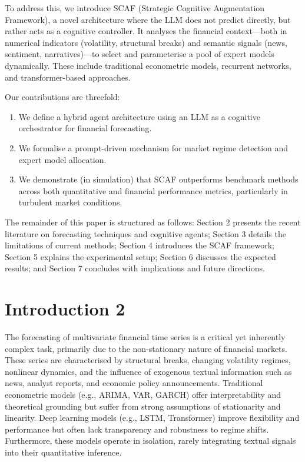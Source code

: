 \documentclass[conference]{IEEEtran}
\begin{document}
To address this, we introduce SCAF (Strategic Cognitive Augmentation Framework), a novel architecture where the LLM does not predict directly, but rather acts as a cognitive controller. It analyses the financial context—both in numerical indicators (volatility, structural breaks) and semantic signals (news, sentiment, narratives)—to select and parameterise a pool of expert models dynamically. These include traditional econometric models, recurrent networks, and transformer-based approaches.

Our contributions are threefold:
\begin{enumerate}
    \item We define a hybrid agent architecture using an LLM as a cognitive orchestrator for financial forecasting.
    \item We formalise a prompt-driven mechanism for market regime detection and expert model allocation.
    \item We demonstrate (in simulation) that SCAF outperforms benchmark methods across both quantitative and financial performance metrics, particularly in turbulent market conditions.
\end{enumerate}

The remainder of this paper is structured as follows: Section 2 presents the recent literature on forecasting techniques and cognitive agents; Section 3 details the limitations of current methods; Section 4 introduces the SCAF framework; Section 5 explains the experimental setup; Section 6 discusses the expected results; and Section 7 concludes with implications and future directions.
\section{Introduction 2}

The forecasting of multivariate financial time series is a critical yet inherently complex task, primarily due to the non-stationary nature of financial markets. These series are characterised by structural breaks, changing volatility regimes, nonlinear dynamics, and the influence of exogenous textual information such as news, analyst reports, and economic policy announcements. Traditional econometric models (e.g., ARIMA, VAR, GARCH) offer interpretability and theoretical grounding but suffer from strong assumptions of stationarity and linearity. Deep learning models (e.g., LSTM, Transformer) improve flexibility and performance but often lack transparency and robustness to regime shifts. Furthermore, these models operate in isolation, rarely integrating textual signals into their quantitative inference.
\end{document}
